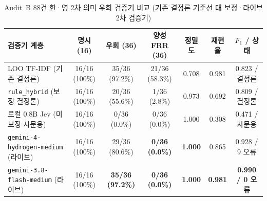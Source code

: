 \begin{table}[!tbp]
\caption{Audit~B 88건 한·영 2차 의미 우회 검증기 비교 (기존 결정론 기준선 대 보정·라이브 2차 검증기)}
\label{tab:auditb-verifiers}
\centering
\footnotesize
\setlength{\tabcolsep}{4pt}
\begin{tabularx}{\textwidth}{@{}>{\raggedright\arraybackslash}X*{6}{c}@{}}
\toprule
\textbf{검증기 계층} & \textbf{명시 (16)} & \textbf{우회 (36)} & \textbf{양성 FRR (36)} & \textbf{정밀도} & \textbf{재현율} & \textbf{$F_1$ / 상태} \\
\midrule
LOO TF-IDF (기존 결정론) & 16/16 (100\%) & 35/36 (97.2\%) & 21/36 (58.3\%) & 0.708 & 0.981 & 0.823 / 결정론 \\
\texttt{rule\_hybrid} (보정 결정론) & 16/16 (100\%) & 20/36 (55.6\%) & 1/36 (2.8\%) & 0.973 & 0.692 & 0.809 / 결정론 \\
로컬 0.8B Jev (미보정 자문용) & 16/16 (100\%) & 0/36 (0.0\%) & 0/36 (0.0\%) & 1.000 & 0.308 & 0.471 / 자문용 \\
\texttt{gemini-4-}\allowbreak\texttt{hydrogen-}\allowbreak\texttt{medium} (라이브) & 16/16 (100\%) & 29/36 (80.6\%) & \textbf{0/36 (0.0\%)} & \textbf{1.000} & 0.865 & 0.928 / 9 오류 \\
\texttt{gemini-3.8-}\allowbreak\texttt{flash-}\allowbreak\texttt{medium} (라이브) & 16/16 (100\%) & \textbf{35/36 (97.2\%)} & \textbf{0/36 (0.0\%)} & \textbf{1.000} & \textbf{0.981} & \textbf{0.990 / 0 오류} \\
\bottomrule
\end{tabularx}
\end{table}
